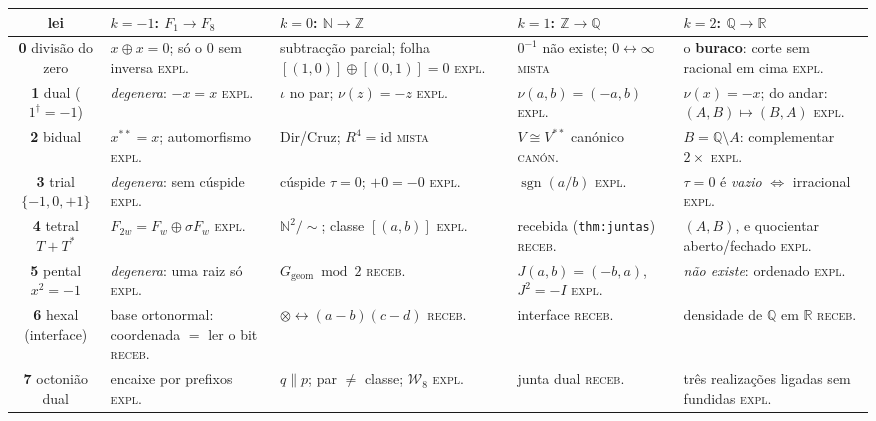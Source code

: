 \documentclass[11pt,a4paper]{article}
\newcommand{\code}[1]{\texttt{\small #1}}
\newcommand{\dg}{^{\dagger}}
\newcommand{\Word}{\mathcal{W}}
\begin{document}
\begin{center}\footnotesize
\begin{tabular}{@{}cp{2.75cm}p{2.75cm}p{2.75cm}p{2.75cm}@{}}
\toprule
lei & $k{=}-1$: $F_1\!\to\!F_8$ & $k{=}0$: $\mathbb{N}\!\to\!\mathbb{Z}$ & $k{=}1$: $\mathbb{Z}\!\to\!\mathbb{Q}$ & $k{=}2$: $\mathbb{Q}\!\to\!\mathbb{R}$ \\
\midrule
\textbf{0} divisão do zero
 & $x\oplus x=0$; só o $0$ sem inversa \hfill\textsc{expl.}
 & subtracção parcial; folha $[(1,0)]\oplus[(0,1)]=0$ \hfill\textsc{expl.}
 & $0^{-1}$ não existe; $0\!\leftrightarrow\!\infty$ \hfill\textsc{mista}
 & o \textbf{buraco}: corte sem racional em cima \hfill\textsc{expl.} \\
\textbf{1} dual ($1\dg=-1$)
 & \emph{degenera}: $-x=x$ \hfill\textsc{expl.}
 & $\iota$ no par; $\nu(z)=-z$ \hfill\textsc{expl.}
 & $\nu(a,b)=(-a,b)$ \hfill\textsc{expl.}
 & $\nu(x)=-x$; do andar: $(A,B)\!\mapsto\!(B,A)$ \hfill\textsc{expl.} \\
\textbf{2} bidual
 & $x^{**}=x$; automorfismo \hfill\textsc{expl.}
 & Dir/Cruz; $R^{4}=\mathrm{id}$ \hfill\textsc{mista}
 & $V\cong V^{**}$ canónico \hfill\textsc{canón.}
 & $B=\mathbb{Q}\setminus A$: complementar $2\times$ \hfill\textsc{expl.} \\
\textbf{3} trial $\{-1,0,+1\}$
 & \emph{degenera}: sem cúspide \hfill\textsc{expl.}
 & cúspide $\tau=0$; $+0=-0$ \hfill\textsc{expl.}
 & $\operatorname{sgn}(a/b)$ \hfill\textsc{expl.}
 & $\tau=0$ é \emph{vazio} $\iff$ irracional \hfill\textsc{expl.} \\
\textbf{4} tetral $T+T^{*}$
 & $F_{2w}=F_w\oplus\sigma F_w$ \hfill\textsc{expl.}
 & $\mathbb{N}^{2}/{\sim}$; classe $[(a,b)]$ \hfill\textsc{expl.}
 & recebida (\code{thm:juntas}) \hfill\textsc{receb.}
 & $(A,B)$, e quocientar aberto/fechado \hfill\textsc{expl.} \\
\textbf{5} pental $x^{2}=-1$
 & \emph{degenera}: uma raiz só \hfill\textsc{expl.}
 & $G_{\mathrm{geom}}\bmod2$ \hfill\textsc{receb.}
 & $J(a,b)=(-b,a)$, $J^{2}=-I$ \hfill\textsc{expl.}
 & \emph{não existe}: ordenado \hfill\textsc{expl.} \\
\textbf{6} hexal (interface)
 & base ortonormal: coordenada $=$ ler o bit \hfill\textsc{receb.}
 & $\otimes\leftrightarrow(a-b)(c-d)$ \hfill\textsc{receb.}
 & interface \hfill\textsc{receb.}
 & densidade de $\mathbb{Q}$ em $\mathbb{R}$ \hfill\textsc{receb.} \\
\textbf{7} octonião dual
 & encaixe por prefixos \hfill\textsc{expl.}
 & $q\parallel p$; par $\neq$ classe; $\Word_8$ \hfill\textsc{expl.}
 & junta dual \hfill\textsc{receb.}
 & três realizações ligadas sem fundidas \hfill\textsc{expl.} \\
\bottomrule
\end{tabular}
\end{center}
\end{document}
